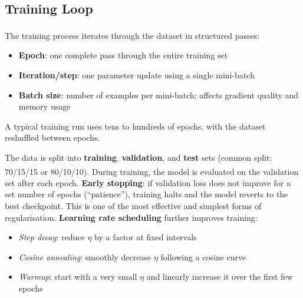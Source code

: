 \subsection{Training Loop}

\begin{tcbitemize}[ skin=sectionraster ]
    \tcbitem[title={Epochs and Batches}, raster multicolumn=3]
    The training process iterates through the dataset in structured passes\textsuperscript{\cite[][pp.~24--26]{fleuretLittleBookDeep}}:
    \begin{itemize}
        \item \textbf{Epoch}: one complete pass through the entire training set
        \item \textbf{Iteration/step}: one parameter update using a single mini-batch
        \item \textbf{Batch size}: number of examples per mini-batch; affects gradient quality and memory usage
    \end{itemize}
    A typical training run uses tens to hundreds of epochs, with the dataset reshuffled between epochs.

    \tcbitem[title={Data Splits and Early Stopping}, raster multicolumn=3]
    The data is split into \textbf{training}, \textbf{validation}, and \textbf{test} sets (common split: 70/15/15 or 80/10/10)\textsuperscript{\cite[][p.~26]{fleuretLittleBookDeep}}.
    During training, the model is evaluated on the validation set after each epoch.
    \textbf{Early stopping}: if validation loss does not improve for a set number of epochs (``patience''), training halts and the model reverts to the best checkpoint.
    This is one of the most effective and simplest forms of regularisation.
    \tcblower
    \textbf{Learning rate scheduling} further improves training:
    \begin{itemize}
        \item \emph{Step decay}: reduce $\eta$ by a factor at fixed intervals
        \item \emph{Cosine annealing}: smoothly decrease $\eta$ following a cosine curve
        \item \emph{Warmup}: start with a very small $\eta$ and linearly increase it over the first few epochs
    \end{itemize}
\end{tcbitemize}

